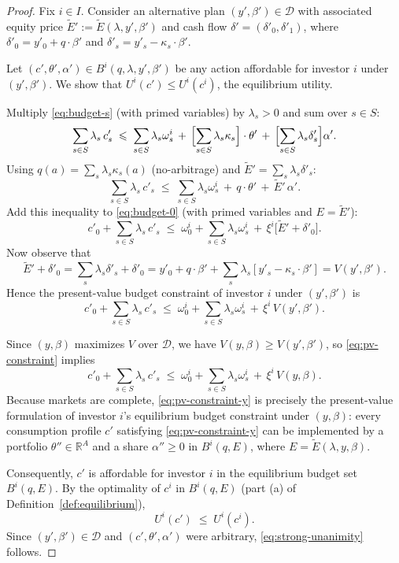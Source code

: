 \documentclass[11pt,a4paper]{article}
\def\R{\mathbb{R}}
\def\leq{\leqslant}
\def\geq{\geqslant}
\theoremstyle{plain}
\theoremstyle{definition}
\theoremstyle{remark}
\begin{document}
\begin{proof}
Fix $i\in I$. Consider an alternative plan $(y',\beta')\in\mathcal{D}$ with associated equity price $\widetilde{E}' := \widetilde{E}(\lambda,y',\beta')$ and cash flow $\delta'=(\delta'_0,\delta'_1)$, where $\delta'_0 = y'_0 + q\cdot\beta'$ and $\delta'_s = y'_s - \kappa_s\cdot\beta'$.

Let $(c',\theta',\alpha')\in B^i(q,\lambda,y',\beta')$ be any action affordable for investor $i$ under $(y',\beta')$. We show that $U^i(c')\leq U^i(c^i)$, the equilibrium utility.

Multiply \eqref{eq:budget-s} (with primed variables) by $\lambda_s>0$ and sum over $s\in S$:
\[
  \sum_{s\in S}\lambda_s\,c'_s
  \;\leq\;
  \sum_{s\in S}\lambda_s\omega^i_s
  \,+\, \Bigl[\sum_{s\in S}\lambda_s\kappa_s\Bigr]\cdot\theta'
  \,+\, \Bigl[\sum_{s\in S}\lambda_s\delta'_s\Bigr]\alpha'.
\]
Using $q(a) = \sum_s\lambda_s\kappa_s(a)$ (no-arbitrage) and $\widetilde{E}' = \sum_s\lambda_s\delta'_s$:
\[
  \sum_{s\in S}\lambda_s\,c'_s
  \;\leq\;
  \sum_{s\in S}\lambda_s\omega^i_s
  \,+\, q\cdot\theta'
  \,+\, \widetilde{E}'\,\alpha'.
\]
Add this inequality to \eqref{eq:budget-0} (with primed variables and $E=\widetilde{E}'$):
\[
  c'_0 + \sum_{s\in S}\lambda_s\,c'_s
  \;\leq\;
  \omega^i_0 + \sum_{s\in S}\lambda_s\omega^i_s
  \,+\, \xi^i\bigl[\widetilde{E}' + \delta'_0\bigr].
\]
Now observe that
\[
  \widetilde{E}' + \delta'_0
  = \sum_s\lambda_s\delta'_s + \delta'_0
  = y'_0 + q\cdot\beta' + \sum_s\lambda_s[y'_s - \kappa_s\cdot\beta']
  = V(y',\beta').
\]
Hence the present-value budget constraint of investor $i$ under $(y',\beta')$ is
\begin{equation}\label{eq:pv-constraint}
  c'_0 + \sum_{s\in S}\lambda_s\,c'_s
  \;\leq\;
  \omega^i_0 + \sum_{s\in S}\lambda_s\omega^i_s
  \,+\, \xi^i\,V(y',\beta').
\end{equation}

Since $(y,\beta)$ maximizes $V$ over $\mathcal{D}$, we have $V(y,\beta)\geq V(y',\beta')$, so \eqref{eq:pv-constraint} implies
\begin{equation}\label{eq:pv-constraint-y}
  c'_0 + \sum_{s\in S}\lambda_s\,c'_s
  \;\leq\;
  \omega^i_0 + \sum_{s\in S}\lambda_s\omega^i_s
  \,+\, \xi^i\,V(y,\beta).
\end{equation}
Because markets are complete, \eqref{eq:pv-constraint-y} is precisely the present-value formulation of investor $i$'s equilibrium budget constraint under $(y,\beta)$: every consumption profile $c'$ satisfying \eqref{eq:pv-constraint-y} can be implemented by a portfolio $\theta''\in\R^A$ and a share $\alpha''\geq 0$ in $B^i(q,E)$, where $E = \widetilde{E}(\lambda,y,\beta)$.

Consequently, $c'$ is affordable for investor $i$ in the equilibrium budget set $B^i(q,E)$. By the optimality of $c^i$ in $B^i(q,E)$ (part (a) of Definition~\ref{def:equilibrium}),
\[
  U^i(c') \;\leq\; U^i(c^i).
\]
Since $(y',\beta')\in\mathcal{D}$ and $(c',\theta',\alpha')$ were arbitrary, \eqref{eq:strong-unanimity} follows.
\end{proof}
\end{document}
